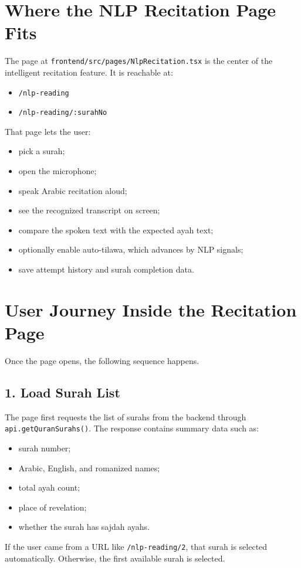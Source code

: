 \documentclass[11pt,a4paper]{article}
\begin{document}
\section{Where the NLP Recitation Page Fits}
The page at \texttt{frontend/src/pages/NlpRecitation.tsx} is the center of the intelligent recitation feature. It is reachable at:
\begin{itemize}
  \item \texttt{/nlp-reading}
  \item \texttt{/nlp-reading/:surahNo}
\end{itemize}

That page lets the user:
\begin{itemize}
  \item pick a surah;
  \item open the microphone;
  \item speak Arabic recitation aloud;
  \item see the recognized transcript on screen;
  \item compare the spoken text with the expected ayah text;
  \item optionally enable auto-tilawa, which advances by NLP signals;
  \item save attempt history and surah completion data.
\end{itemize}

\section{User Journey Inside the Recitation Page}
Once the page opens, the following sequence happens.

\subsection{1. Load Surah List}
The page first requests the list of surahs from the backend through \texttt{api.getQuranSurahs()}. The response contains summary data such as:
\begin{itemize}
  \item surah number;
  \item Arabic, English, and romanized names;
  \item total ayah count;
  \item place of revelation;
  \item whether the surah has sajdah ayahs.
\end{itemize}

If the user came from a URL like \texttt{/nlp-reading/2}, that surah is selected automatically. Otherwise, the first available surah is selected.
\end{document}
